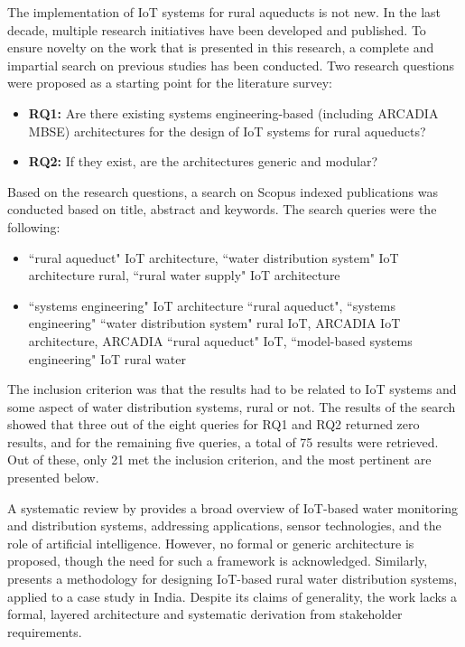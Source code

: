 \documentclass[conference]{IEEEtran}
\begin{document}
The implementation of IoT systems for rural aqueducts is not new. In the last decade, multiple research initiatives have been developed and published. To ensure novelty on the work that is presented in this research, a complete and impartial search on previous studies has been conducted. Two research questions were proposed as a starting point for the literature survey:

\begin{itemize}
        \item \textbf{RQ1:} Are there existing systems engineering-based (including ARCADIA MBSE) architectures for the design of IoT systems for rural aqueducts?
        \item \textbf{RQ2:} If they exist, are the architectures generic and modular?
\end{itemize} 

Based on the research questions, a search on Scopus indexed publications was conducted based on title, abstract and keywords. The search queries were the following: 
\begin{itemize}
    \item ``rural aqueduct" IoT architecture, ``water distribution system" IoT architecture rural, ``rural water supply" IoT architecture
    \item ``systems engineering" IoT architecture ``rural aqueduct", ``systems engineering" ``water distribution system" rural IoT, ARCADIA IoT architecture, ARCADIA ``rural aqueduct" IoT, ``model-based systems engineering" IoT rural water 
\end{itemize}

The inclusion criterion was that the results had to be related to IoT systems and some aspect of water distribution systems, rural or not. The results of the search showed that three out of the eight queries for RQ1 and RQ2 returned zero results, and for the remaining five queries, a total of 75 results were retrieved.
Out of these, only 21 met the inclusion criterion, and the most pertinent are presented below.

A systematic review by \cite{w14223621} provides a broad overview of IoT-based water monitoring and distribution systems, addressing applications, sensor technologies, and the role of artificial intelligence. However, no formal or generic architecture is proposed, though the need for such a framework is acknowledged. Similarly, \cite{Maroli2021Framework} presents a methodology for designing IoT-based rural water distribution systems, applied to a case study in India. Despite its claims of generality, the work lacks a formal, layered architecture and systematic derivation from stakeholder requirements.
\end{document}
